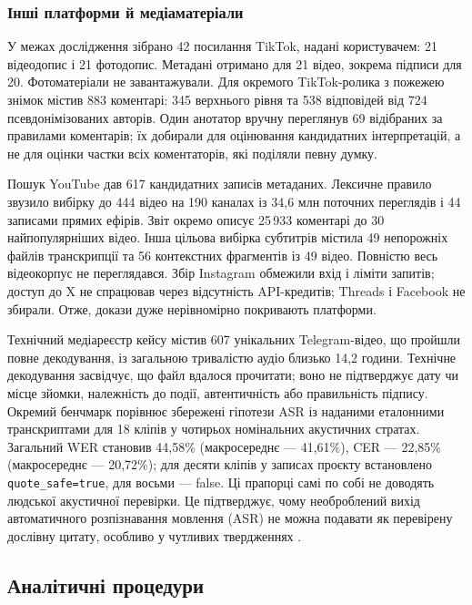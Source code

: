 \subsubsection{Інші платформи й медіаматеріали}

У межах дослідження зібрано 42 посилання TikTok, надані користувачем: 21 відеодопис і 21 фотодопис. Метадані отримано для 21 відео, зокрема підписи для 20. Фотоматеріали не завантажували. Для окремого TikTok-ролика з пожежею знімок містив 883 коментарі: 345 верхнього рівня та 538 відповідей від 724 псевдонімізованих авторів. Один анотатор вручну переглянув 69 відібраних за правилами коментарів; їх добирали для оцінювання кандидатних інтерпретацій, а не для оцінки частки всіх коментаторів, які поділяли певну думку.

Пошук YouTube дав 617 кандидатних записів метаданих. Лексичне правило звузило вибірку до 444 відео на 190 каналах із 34,6 млн поточних переглядів і 44 записами прямих ефірів. Звіт окремо описує 25\,933 коментарі до 30 найпопулярніших відео. Інша цільова вибірка субтитрів містила 49 непорожніх файлів транскрипції та 56 контекстних фрагментів із 49 відео. Повністю весь відеокорпус не переглядався. Збір Instagram обмежили вхід і ліміти запитів; доступ до X не спрацював через відсутність API-кредитів; Threads і Facebook не збирали. Отже, докази дуже нерівномірно покривають платформи.

Технічний медіареєстр кейсу містив 607 унікальних Telegram-відео, що пройшли повне декодування, із загальною тривалістю аудіо близько 14,2 години. Технічне декодування засвідчує, що файл вдалося прочитати; воно не підтверджує дату чи місце зйомки, належність до події, автентичність або правильність підпису. Окремий бенчмарк порівнює збережені гіпотези ASR із наданими еталонними транскриптами для 18 кліпів у чотирьох номінальних акустичних стратах. Загальний WER становив 44,58\% (макросереднє — 41,61\%), CER — 22,85\% (макросереднє — 20,72\%); для десяти кліпів у записах проєкту встановлено \texttt{quote\_safe=true}, для восьми — false. Ці прапорці самі по собі не доводять людської акустичної перевірки. Це підтверджує, чому необроблений вихід автоматичного розпізнавання мовлення (ASR) не можна подавати як перевірену дослівну цитату, особливо у чутливих твердженнях \citep{socialasr2026}.

\subsection{Аналітичні процедури}

